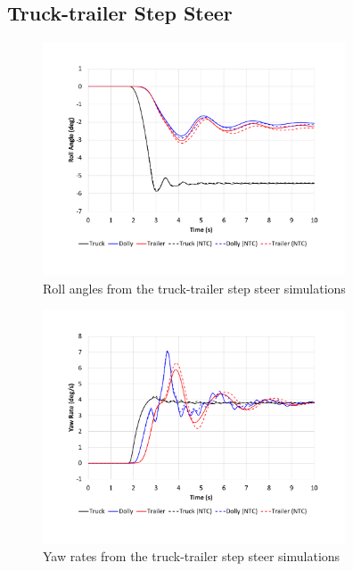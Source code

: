 \subsection{Truck-trailer Step Steer}\label{appendix:truck-trailer-validation-ss}

\begin{figure}[H]
	\centering
	\includegraphics[width=0.8\textwidth]{fig/ntc-truck-trailer_ssa}
	\caption{Roll angles from the truck-trailer step steer simulations}
	\label{figure:ntc-truck-trailer_ssa}
\end{figure}

\begin{figure}[H]
	\centering
	\includegraphics[width=0.8\textwidth]{fig/ntc-truck-trailer_ssb}
	\caption{Yaw rates from the truck-trailer step steer simulations}
	\label{figure:ntc-truck-trailer_ssb}
\end{figure}


